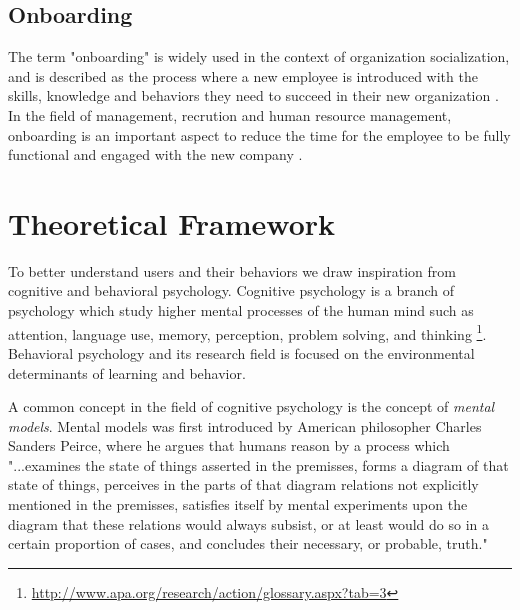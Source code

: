 \subsection{Onboarding}

The term "onboarding" is widely used in the context of organization socialization, and is described as the process where a new employee is introduced with the skills, knowledge and behaviors they need to succeed in their new organization \cite{Bauer2011}. In the field of management, recrution and human resource management, onboarding is an important aspect to reduce the time for the employee to be fully functional and engaged with the new company \cite{GraybillJolieO;HudsonCarpenterMariaTaesil;OffordJeromeJr;PiorunMary;Shaffer2013}.

\section{Theoretical Framework}

To better understand users and their behaviors we draw inspiration from cognitive and behavioral psychology. Cognitive psychology is a branch of psychology which study higher mental processes of the human mind such as attention, language use, memory, perception, problem solving, and thinking \footnote{\url{http://www.apa.org/research/action/glossary.aspx?tab=3}}. Behavioral psychology and its research field is focused on the environmental determinants of learning and behavior.


A common concept in the field of cognitive psychology is the concept of \textit{mental models}. Mental models was first introduced by American philosopher Charles Sanders Peirce, where he argues that humans reason by a process which
"...examines the state of things
asserted in the premisses, forms a diagram of that state of things, perceives in the parts of that diagram relations not explicitly mentioned in the premisses, satisfies itself by mental experiments upon the diagram that these relations would always subsist, or at least would do so in a certain proportion of cases, and concludes their necessary, or probable, truth." \cite{Pierce1974}

